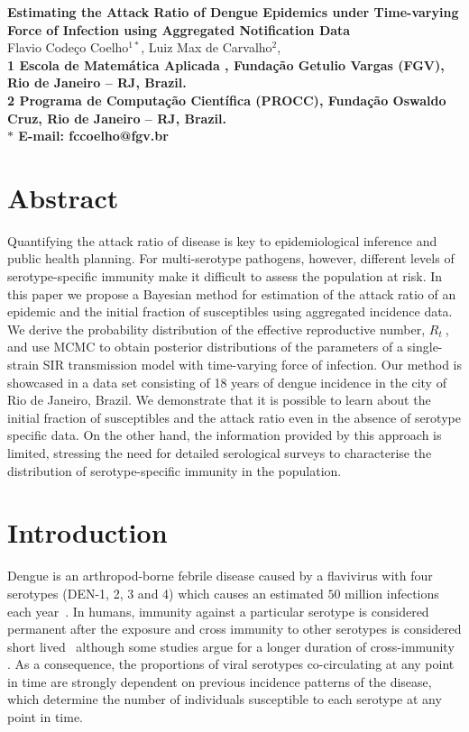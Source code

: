 \documentclass[10pt]{article}
\date{}
\def \rr {$R_{t}\:$}
\begin{document}
\begin{flushleft}
{\Large
\textbf{Estimating the Attack Ratio of Dengue Epidemics under Time-varying 
Force of Infection using Aggregated Notification Data}
}
\\
Flavio Code\c{c}o Coelho$^{1\ast}$, 
Luiz Max de Carvalho$^{2}$, 
\\
\bf{1} Escola de Matem\'atica Aplicada , Funda\c{c}\~ao Getulio Vargas (FGV), 
Rio de Janeiro -- RJ, Brazil.
\\
\bf{2} Programa de Computa\c{c}\~ao Cient\'ifica (PROCC), Funda\c{c}\~ao Oswaldo 
Cruz, Rio de Janeiro -- RJ, Brazil.
\\
$\ast$ E-mail: fccoelho@fgv.br
\end{flushleft}

\section*{Abstract}

Quantifying the attack ratio of disease is key to epidemiological inference and 
public health planning.
For multi-serotype pathogens, however, different levels of 
serotype-specific immunity make it difficult to assess the population at risk. 
In this paper we propose a Bayesian method for estimation of the attack ratio 
of an epidemic and the initial fraction of susceptibles using aggregated 
incidence data. 
We derive the probability distribution of the effective reproductive number, 
\rr, and use MCMC to obtain posterior 
distributions of the parameters of a single-strain SIR transmission model with 
time-varying force of infection.
Our method is showcased in a data set consisting of 18 years of dengue 
incidence in the city of Rio de Janeiro, Brazil.
We demonstrate that it is possible to learn about the initial fraction of 
susceptibles and the attack ratio even in the absence of serotype specific data.
On the other hand, the information provided by this approach is limited, 
stressing the need for detailed serological surveys to characterise the 
distribution of serotype-specific immunity in the population.

\section*{Introduction}

Dengue is an arthropod-borne febrile disease caused by a flavivirus with four 
serotypes (DEN-1, 2, 3 and 4) which causes an estimated  $50$ million 
infections each 
year~\citep{Guzman2010}.
In humans, immunity against a particular serotype is considered permanent 
after the exposure and cross immunity to other serotypes is considered short 
lived~\citep{halstead_dengue_2007} although some 
studies argue for a longer duration of cross-immunity \citep{Reich2013, 
salje2012}.
As a consequence, the proportions of viral serotypes co-circulating at any 
point in time are strongly dependent on previous incidence patterns of the 
disease, which determine the number of individuals susceptible to each serotype 
at any point in time.
\end{document}
